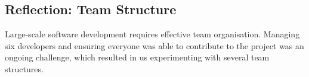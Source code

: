 \documentclass{l3proj}
\begin{document}
%


\subsection{Reflection: Team Structure}
\label{sec:teamstructure}
%


Large-scale software development requires effective team organisation. Managing six developers and ensuring everyone was able to contribute to the project was an ongoing challenge, which resulted in us experimenting with several team structures.
\end{document}
